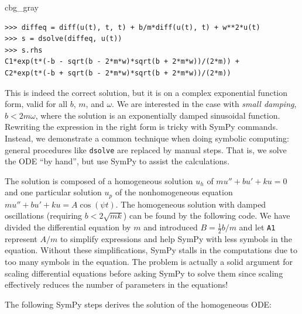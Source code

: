 \documentclass[graybox,envcountchap,sectrefs,final]{svmonodo}
\newenvironment{_cod_tight}[1]{
   \def\FrameCommand{\colorbox{#1}}
   \FrameRule0.6pt\MakeFramed {\FrameRestore}\vskip3mm}
   {\vskip0mm\endMakeFramed}
\newenvironment{cod}[1]{
\bgroup\rmfamily
\fboxsep=0mm\relax
\begin{_cod_tight}{#1}
\list{}{\parsep=-2mm\parskip=0mm\topsep=0pt\leftmargin=2mm
\rightmargin=2\leftmargin\leftmargin=4pt\relax}
\item\relax}
{\endlist\end{_cod_tight}\egroup}
\begin{document}
\begin{cod}{cbg_gray}\begin{Verbatim}[numbers=none,fontsize=\fontsize{9pt}{9pt},baselinestretch=0.95,xleftmargin=2mm]
>>> diffeq = diff(u(t), t, t) + b/m*diff(u(t), t) + w**2*u(t)
>>> s = dsolve(diffeq, u(t))
>>> s.rhs
C1*exp(t*(-b - sqrt(b - 2*m*w)*sqrt(b + 2*m*w))/(2*m)) +
C2*exp(t*(-b + sqrt(b - 2*m*w)*sqrt(b + 2*m*w))/(2*m))
\end{Verbatim}
\end{cod}
\noindent
This is indeed the correct solution, but it is on a complex
exponential function form, valid for all $b$, $m$, and $\omega$. We are
interested in the case with \emph{small damping}, $b < 2m\omega$, where the solution
is an exponentially damped sinusoidal function. Rewriting the expression
in the right form is tricky with SymPy commands. Instead, we demonstrate
a common technique when doing symbolic computing: general procedures like
\texttt{dsolve} are replaced by manual steps. That is, we solve the ODE ``by hand'',
but use SymPy to assist the calculations.

The solution is composed of a homogeneous
solution $u_h$ of $mu'' + bu' + ku=0$ and one particular solution $u_p$
of the nonhomogeneous equation
$mu'' + bu' + ku=A\cos(\psi t)$. The homogeneous solution with
damped oscillations (requiring $b < 2\sqrt{mk}$) can be
found by the following code. We have divided the differential equation
by $m$ and introduced $B=\frac{1}{2}b/m$ and let \texttt{A1} represent
$A/m$ to simplify expressions and
help SymPy with less symbols in the equation. Without these simplifications,
SymPy stalls in the computations due to too many symbols in the equation.
The problem is actually a solid argument for scaling differential equations
before asking SymPy to solve them since scaling effectively reduces the
number of parameters in the equations!

The following SymPy steps derives the solution of the homogeneous ODE:
\end{document}
